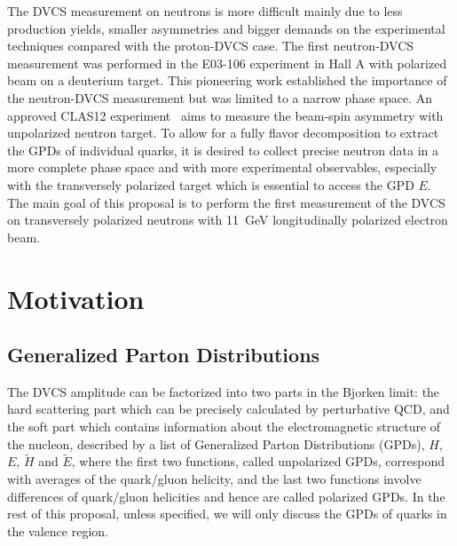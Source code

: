 The DVCS measurement on neutrons is more difficult mainly due to less production yields, smaller asymmetries and bigger demands on the experimental techniques compared with the proton-DVCS case. The first neutron-DVCS measurement was performed in the E03-106 experiment in Hall A with polarized beam on a deuterium target. This pioneering work established the importance of the neutron-DVCS measurement but was limited to a narrow phase space. An approved CLAS12 experiment~\cite{clas12:e12-11-003} aims to measure the beam-spin asymmetry with unpolarized neutron target. To allow for a fully flavor decomposition to extract the GPDs of individual quarks, it is desired to collect precise neutron data in a more complete phase space and with more experimental observables, especially with the transversely polarized target which is essential to access the GPD $E$. The main goal of this proposal is to perform the first measurement of the DVCS on transversely polarized neutrons with 11~GeV longitudinally polarized electron beam.
\section {Motivation}
\subsection{Generalized Parton Distributions}
The DVCS amplitude can be factorized into two parts in the Bjorken limit: the hard scattering part which can be precisely calculated by perturbative QCD, and the soft part which contains information about the electromagnetic structure of the nucleon, described by a list of Generalized Parton Distributions (GPDs), $H$, $E$, $\tilde H$ and $\tilde E$, where the first two functions, called unpolarized GPDs, correspond with averages of the quark/gluon helicity, and the last two functions involve differences of quark/gluon helicities and hence are called polarized GPDs. In the rest of this proposal, unless specified, we will only discuss the GPDs of quarks in the valence region.

